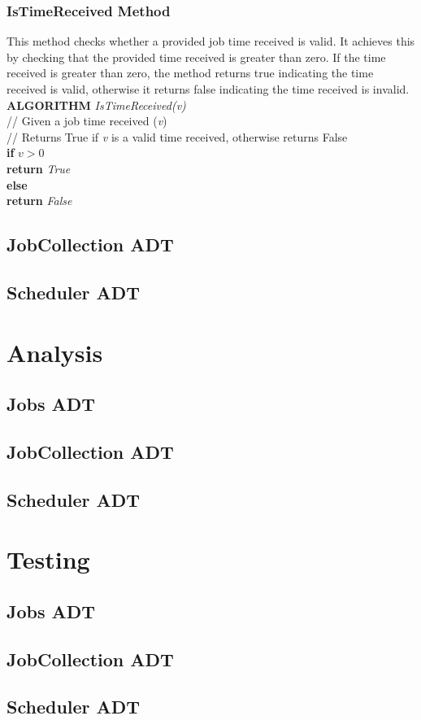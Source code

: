 \documentclass[12pt,a4paper]{article}
\begin{document}
			\subsubsection{IsTimeReceived Method}
				This method checks whether a provided job time received is valid. It achieves this by
				checking that the provided time received is greater than zero. If the time received is
				greater than zero, the method returns true indicating the time received is valid, otherwise
				it returns false indicating the time received is invalid.\\

				\textbf{ALGORITHM} \textit{IsTimeReceived(v)}\\
				\null\qquad\quad// Given a job time received (\textit{v})\\
				\null\qquad\quad// Returns True if \textit{v} is a valid time received, otherwise returns False\\
				\null\qquad\quad\textbf{if} \textit{$v > 0$}\\
				\null\qquad\qquad\textbf{return} \textit{True}\\
				\null\qquad\quad\textbf{else}\\
				\null\qquad\qquad\textbf{return} \textit{False}
		\subsection{JobCollection ADT}
		\subsection{Scheduler ADT}
	
	\section{Analysis}
		\subsection{Jobs ADT}
		\subsection{JobCollection ADT}
		\subsection{Scheduler ADT}

	\section{Testing}
		\subsection{Jobs ADT}
		\subsection{JobCollection ADT}
		\subsection{Scheduler ADT}
\end{document}
